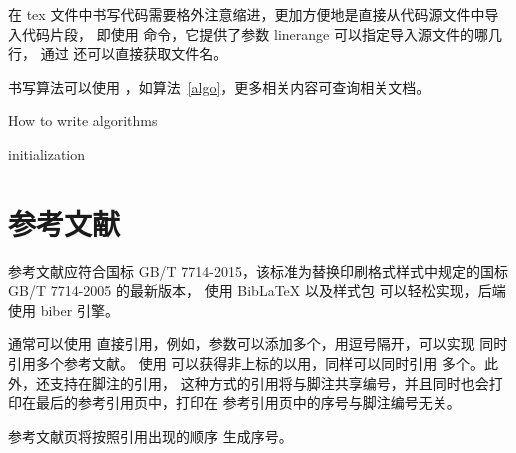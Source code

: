 在 tex 文件中书写代码需要格外注意缩进，更加方便地是直接从代码源文件中导入代码片段，
即使用  命令，它提供了参数 linerange 可以指定导入源文件的哪几行，
通过  还可以直接获取文件名。



书写算法可以使用 ，如算法~\ref{algo}，更多相关内容可查询相关文档。

\begin{algorithm}[!htbp]
    \SetAlgoLined\normalem\linespread{1.2}\small
    \caption{How to write algorithms}\label{algo}
    initialization\;
\end{algorithm}

\section{参考文献}

参考文献应符合国标 GB/T 7714-2015，该标准为替换印刷格式样式中规定的国标 GB/T 7714-2005 的最新版本，
使用 Bib\LaTeX{} 以及样式包  可以轻松实现，后端使用 biber 引擎。

通常可以使用  直接引用，例如\cite{lamport1986document}，参数可以添加多个，用逗号隔开，可以实现
同时引用多个参考文献\cite{chen2005zhulu,chu2004tushu,stamerjohanns2009mathml}。
使用  可以获得非上标的以用\parencite{betts2005aging}，同样可以同时引用
多个\parencite{bravo1990comparative,hls2012jinji,niu2013zonghe}。此外，还支持在脚注的引用，
这种方式的引用将与脚注共享编号，并且同时也会打印在最后的参考引用页中，打印在
参考引用页中的序号与脚注编号无关。

参考文献页\cite{yuan2012lana,yuan2012lanb,yuan2012lanc}将按照引用出现的顺序
生成序号\parencite{Bohan1928,Dubrovin1906}。